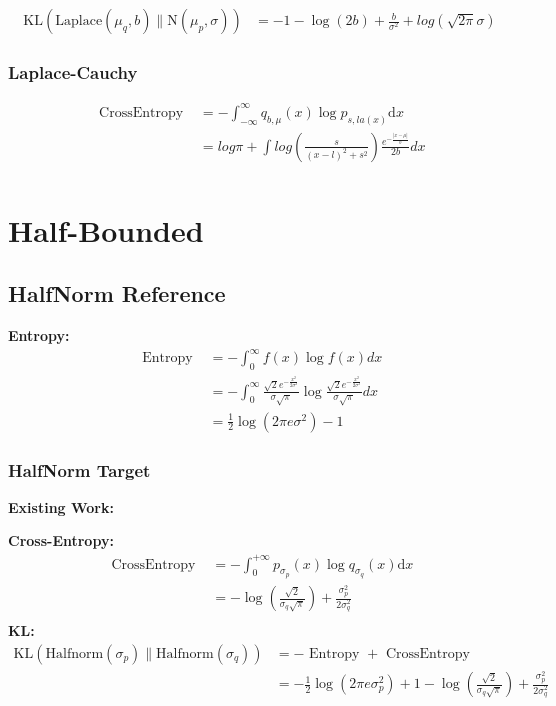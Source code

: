 \documentclass{article}
\begin{document}
$$ \begin{aligned} \mathrm{KL}\left(\mathrm{Laplace}\left(\mu_{q}, b\right) \| \mathrm{N}\left(\mu_{p}, \sigma\right)\right)&= -1-\log \left(2 b\right)+\frac{b}{\sigma^{2}}+log(\sqrt{2\pi}\sigma) 
 \end{aligned}
 $$
 
\subsubsection{Laplace-Cauchy}
$$ \begin{aligned} \text { CrossEntropy }&=
-\int_{-\infty}^{\infty} q_{b,\mu}(x) \log p_{s, la(x)} \mathrm{d} x \\
&=log\pi+ \int log(\frac{s}{(x-l)^{2}+s^{2}} )\frac{e^{-\frac{\left | x-\mu \right | }{b} } }{2b} dx \\
\end{aligned}
 $$
 
\section{Half-Bounded}
\subsection{HalfNorm Reference}

\noindent \textbf{Entropy:}
$$ \begin{aligned} \text { Entropy }&=-\int_{0}^{\infty} f(x) \log f(x) d x\\&=-\int_{0}^{\infty}\frac{\sqrt{2}e^{-\frac{x^{2} }{2\sigma^{2}}}}{\sigma\sqrt{\pi}}\log\frac{\sqrt{2}e^{-\frac{x^{2} }{2\sigma^{2}}}}{\sigma\sqrt{\pi}} d x\\&=\frac{1}{2} \log\left(2 \pi e \sigma^{2}\right)-1
\end{aligned} $$

\subsubsection{HalfNorm Target}

\noindent \textbf{Existing Work:}

\noindent \textbf{Cross-Entropy:}
$$ \begin{aligned} \text { CrossEntropy }&=-\int_{0}^{+\infty} p_{\sigma_{p}}(x) \log q_{\sigma_{q}}(x) \mathrm{d} x \\&=
-\log(\frac{\sqrt{2}}{\sigma_{q}\sqrt{\pi}} )+\frac{\sigma_{p}^{2}}{2\sigma_{q}^{2}} \\
\end{aligned} $$
\noindent \textbf{KL:}
$$ \begin{aligned}\mathrm{KL}\left(\mathrm{Halfnorm}\left(\sigma_{p}\right) \| \mathrm{Halfnorm}\left(\sigma_{q}\right)\right)&=-\text { Entropy }+\text{ CrossEntropy }\\&=
- \frac{1}{2} \log\left(2 \pi e \sigma_{p}^{2}\right)+1 -\log(\frac{\sqrt{2}}{\sigma_{q}\sqrt{\pi}} )+\frac{\sigma_{p}^{2}}{2\sigma_{q}^{2}} \\
\end{aligned} $$
\end{document}

